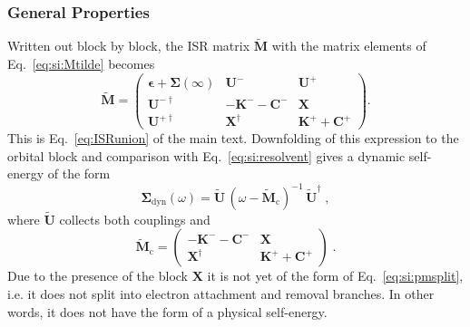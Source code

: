 \documentclass[aip,jcp,reprint,noshowkeys,superscriptaddress]{revtex4-2}
\theoremstyle{plain}
\theoremstyle{definition}
\theoremstyle{remark}
\begin{document}
\subsubsection{General Properties}
Written out block by block, the ISR matrix $\tilde{\mathbf{M}}$ with the matrix elements of Eq.~\eqref{eq:si:Mtilde} becomes
\begin{equation}
\tilde{\mathbf{M}}=
\begin{pmatrix}
\pmb{\epsilon}+\pmb{\Sigma}(\infty) & \mathbf{U}^{-} & \mathbf{U}^{+}\\
\mathbf{U}^{-\dagger} & -\mathbf{K}^{-}-\mathbf{C}^{-} & \mathbf{X}\\
\mathbf{U}^{+\dagger} & \mathbf{X}^{\dagger} & \mathbf{K}^{+}+\mathbf{C}^{+}
\end{pmatrix} .
\label{eq:si:union}
\end{equation}
This is Eq.~\eqref{eq:ISRunion} of the main text.
Downfolding of this expression to the orbital block and comparison with Eq.~\eqref{eq:si:resolvent} gives a dynamic self-energy of the form
\begin{equation}
\pmb{\Sigma}_{\mathrm{dyn}}(\omega)=\tilde{\mathbf{U}}\,(\omega-\tilde{\mathbf{M}}_{\mathrm{c}})^{-1}\,\tilde{\mathbf{U}}^\dagger \;,
\label{eq:si:unionexact}
\end{equation}
where $\tilde{\mathbf{U}}$ collects both couplings and
\begin{equation}
\tilde{\mathbf{M}}_{\mathrm{c}} = 
\begin{pmatrix}
 -\mathbf{K}^{-}-\mathbf{C}^{-} & \mathbf{X}\\
\mathbf{X}^{\dagger} & \mathbf{K}^{+}+\mathbf{C}^{+}
\end{pmatrix} \;.
\end{equation}
Due to the presence of the block $\mathbf{X}$ it is not yet of the form of Eq.~\eqref{eq:si:pmsplit}, i.e. it does not split into electron attachment and removal branches. In other words, it does not have the form of a physical self-energy.
\end{document}
